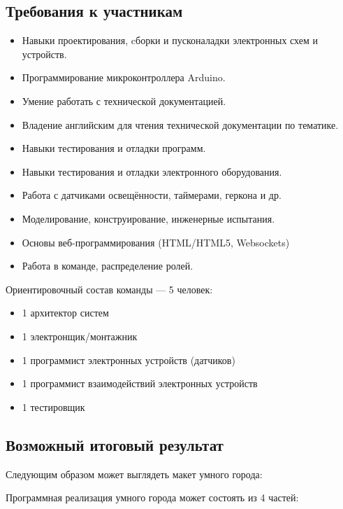 \subsection*{Требования к участникам}

\begin{itemize}
    \item Навыки проектирования, cборки и пусконаладки электронных схем и устройств.
    \item Программирование микроконтроллера Arduino.
    \item Умение работать с технической документацией.
    \item Владение английским для чтения технической документации по тематике.
    \item Навыки тестирования и отладки программ.
    \item Навыки тестирования и отладки электронного оборудования.
    \item Работа с датчиками освещённости, таймерами, геркона и др.
    \item Моделирование, конструирование, инженерные испытания.
    \item Основы веб-программирования (HTML/HTML5, Websockets)
    \item Работа в команде, распределение ролей.        
\end{itemize}

Ориентировочный состав команды — 5 человек:
\begin{itemize}
    \item 1 архитектор систем
    \item 1 электронщик/монтажник
    \item 1 программист электронных устройств (датчиков)
    \item 1 программист взаимодействий электронных устройств
    \item 1 тестировщик        
\end{itemize}

\subsection*{Возможный итоговый результат}

Следующим образом может выглядеть макет умного города:


Программная реализация умного города может состоять из 4 частей:

